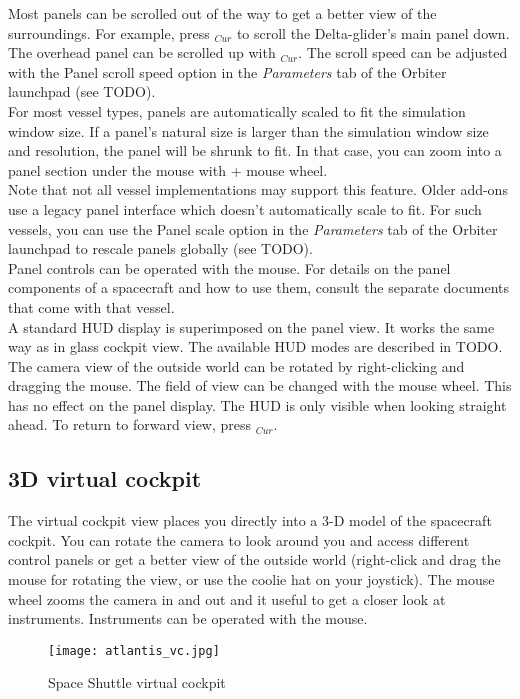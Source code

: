\documentclass[Orbiter User Manual.tex]{subfiles}
\begin{document}
\noindent
Most panels can be scrolled out of the way to get a better view of the surroundings. For example, press \DArrow$_{Cur}$ to scroll the Delta-glider's main panel down. The overhead panel can be scrolled up with \UArrow$_{Cur}$. The scroll speed can be adjusted with the Panel scroll speed option in the \textit{Parameters} tab of the Orbiter launchpad (see TODO).\\
For most vessel types, panels are automatically scaled to fit the simulation window size. If a panel's natural size is larger than the simulation window size and resolution, the panel will be shrunk to fit. In that case, you can zoom into a panel section under the mouse with \Ctrl + mouse wheel.\\
Note that not all vessel implementations may support this feature. Older add-ons use a legacy panel interface which doesn't automatically scale to fit. For such vessels, you can use the Panel scale option in the \textit{Parameters} tab of the Orbiter launchpad to rescale panels globally (see TODO).\\
Panel controls can be operated with the mouse. For details on the panel components of a spacecraft and how to use them, consult the separate documents that come with that vessel.\\
A standard HUD display is superimposed on the panel view. It works the same way as in glass cockpit view. The available HUD modes are described in TODO.\\
The camera view of the outside world can be rotated by right-clicking and dragging the mouse. The field of view can be changed with the mouse wheel. This has no effect on the panel display. The HUD is only visible when looking straight ahead. To return to forward view, press \Home$_{Cur}$.


\subsection{3D virtual cockpit}
The virtual cockpit view places you directly into a 3-D model of the spacecraft cockpit. You can rotate the camera to look around you and access different control panels or get a better view of the outside world (right-click and drag the mouse for rotating the view, or use the coolie hat on your joystick). The mouse wheel zooms the camera in and out and it useful to get a closer look at instruments. Instruments can be operated with the mouse.

\begin{figure}[H]
  \centering
  \texttt{[image: atlantis\_vc.jpg]}
  \caption{Space Shuttle virtual cockpit}
\end{figure}
\end{document}
